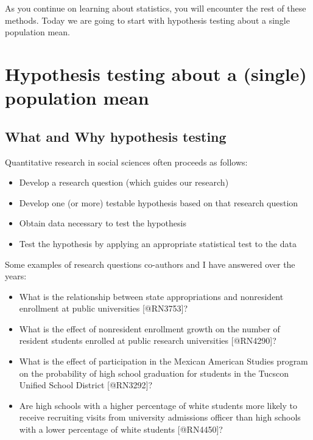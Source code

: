 \documentclass[
  letterpaper,
  DIV=11,
  numbers=noendperiod]{scrartcl}
\providecommand{\tightlist}{%
  \setlength{\itemsep}{0pt}\setlength{\parskip}{0pt}}\usepackage{longtable,booktabs,array}
\begin{document}
As you continue on learning about statistics, you will encounter the
rest of these methods. Today we are going to start with hypothesis
testing about a single population mean.

\section{Hypothesis testing about a (single) population
mean}\label{hypothesis-testing-about-a-single-population-mean}

\subsection{What and Why hypothesis
testing}\label{what-and-why-hypothesis-testing}

Quantitative research in social sciences often proceeds as follows:

\begin{itemize}
\tightlist
\item
  Develop a research question (which guides our research)
\item
  Develop one (or more) testable hypothesis based on that research
  question
\item
  Obtain data necessary to test the hypothesis
\item
  Test the hypothesis by applying an appropriate statistical test to the
  data
\end{itemize}

Some examples of research questions co-authors and I have answered over
the years:

\begin{itemize}
\tightlist
\item
  What is the relationship between state appropriations and nonresident
  enrollment at public universities {[}@RN3753{]}?
\item
  What is the effect of nonresident enrollment growth on the number of
  resident students enrolled at public research universities
  {[}@RN4290{]}?
\item
  What is the effect of participation in the Mexican American Studies
  program on the probability of high school graduation for students in
  the Tucscon Unified School District {[}@RN3292{]}?
\item
  Are high schools with a higher percentage of white students more
  likely to receive recruiting visits from university admissions officer
  than high schools with a lower percentage of white students
  {[}@RN4450{]}?
\end{itemize}
\end{document}
